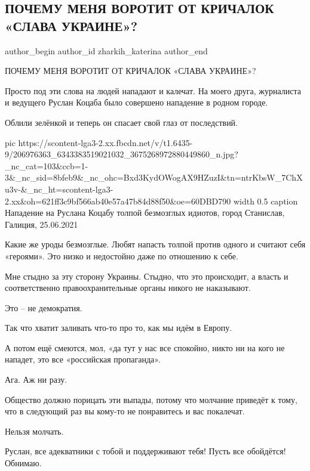  
 
 
 
 
 
\subsection{ПОЧЕМУ МЕНЯ ВОРОТИТ ОТ КРИЧАЛОК «СЛАВА УКРАИНЕ»?}
\label{sec:25_06_2021.fb.zharkih_katerina.1.krichalka_slava_ukraine}
\ifcmt
 author_begin
   author_id zharkih_katerina
 author_end
\fi

ПОЧЕМУ МЕНЯ ВОРОТИТ ОТ КРИЧАЛОК «СЛАВА УКРАИНЕ»?

Просто под эти слова на людей нападают и калечат. На моего друга, журналиста и
ведущего Руслан Коцаба было совершено нападение в  родном городе. 

Облили зелёнкой и теперь он спасает свой глаз от последствий. 

\ifcmt
  pic https://scontent-lga3-2.xx.fbcdn.net/v/t1.6435-9/206976363_6343383519021032_3675268972880449860_n.jpg?_nc_cat=103&ccb=1-3&_nc_sid=8bfeb9&_nc_ohc=Bxd3KydOWogAX9HZuzI&tn=ntrKbsW_7ChXu3v-&_nc_ht=scontent-lga3-2.xx&oh=621ff3c9bf566ab40e57a47b84d88f50&oe=60DBD790
	width 0.5
	caption Нападение на Руслана Коцабу толпой безмозглых идиотов, город Станислав, Галиция, 25.06.2021
\fi

Какие же уроды безмозглые. Любят напасть толпой против одного и считают себя
«героями». Это низко и недостойно даже по отношению к себе. 

Мне стыдно за эту сторону Украины. Стыдно, что это происходит, а власть и
соответственно правоохранительные органы никого не наказывают. 

Это – не демократия. 

Так что хватит заливать что-то про то, как мы идём в Европу. 

А потом ещё смеются, мол, «да тут у нас все спокойно, никто ни на кого не
нападет, это все «российская пропаганда». 

Ага. Аж ни разу. 

Общество должно порицать эти выпады, потому что молчание приведёт к тому, что в
следующий раз вы кому-то не понравитесь и вас покалечат. 

Нельзя молчать. 

Руслан, все адекватники с тобой и поддерживают тебя! Пусть все обойдётся!
Обнимаю.

